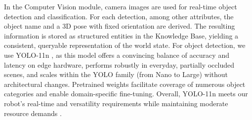 In the Computer Vision module, camera images are used for real-time object detection and classification. For each detection, among other attributes, the object name and a 3D pose with fixed orientation are derived. The resulting information is stored as structured entities in the Knowledge Base, yielding a consistent, queryable representation of the world state. For object detection, we use YOLO-11n \cite{ultralytics-yolo11}, as this model offers a convincing balance of accuracy and latency on edge hardware, performs robustly in everyday, partially occluded scenes, and scales within the YOLO family (from Nano to Large) without architectural changes. Pretrained weights facilitate coverage of numerous object categories and enable domain-specific fine-tuning. Overall, YOLO-11n meets our robot's real-time and versatility requirements while maintaining moderate resource demands \cite{ultralytics-yolo11}.
